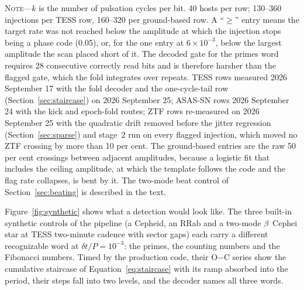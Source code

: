 \documentclass[final,5p]{elsarticle}
\newcommand{\oc}{O$-$C}
\newcommand{\dtp}{\ensuremath{\delta t/P}}
\newcommand{\bcep}{\ensuremath{\beta}~Cephei}
\begin{document}
\begin{table}[tp]
\begin{minipage}{\textwidth}
\vspace{1pt}
\small \textsc{Note}---$k$ is the number of pulsation cycles per bit. 40 hosts per row; 130--360 injections per TESS row, 160--320 per ground-based row. A ``$\ge$'' entry means the target rate was not reached below the amplitude at which the injection stops being a phase code (0.05), or, for the one entry at $6\times10^{-3}$, below the largest amplitude the scan placed short of it. The decoded gate for the primes word requires 28 consecutive correctly read bits and is therefore harsher than the flagged gate, which the fold integrates over repeats. TESS rows measured 2026 September 17 with the fold decoder and the one-cycle-tail row (Section~\ref{sec:staircase}) on 2026 September 25; ASAS-SN rows 2026 September 24 with the kick and epoch-fold routes; ZTF rows re-measured on 2026 September 25 with the quadratic drift removed before the jitter regression (Section~\ref{sec:sparse}) and stage~2 run on every flagged injection, which moved no ZTF crossing by more than 10 per cent. The ground-based entries are the raw 50 per cent crossings between adjacent amplitudes, because a logistic fit that includes the ceiling amplitude, at which the template follows the code and the flag rate collapses, is bent by it. The two-mode beat control of Section~\ref{sec:beating} is described in the text.
\end{minipage}
\end{table}

Figure~\ref{fig:synthetic} shows what a detection would look like. The three built-in synthetic controls of the pipeline (a Cepheid, an RRab and a two-mode \bcep{} star at TESS two-minute cadence with sector gaps) each carry a different recognizable word at $\dtp=10^{-3}$: the primes, the counting numbers and the Fibonacci numbers. Timed by the production code, their \oc{} series show the cumulative staircase of Equation~\ref{eq:staircase} with its ramp absorbed into the period, their steps fall into two levels, and the decoder names all three words.
\end{document}
